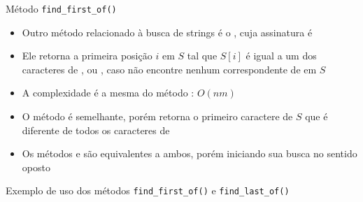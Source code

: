 \begin{frame}[fragile]{Método {\tt find\_first\_of()}}

    \begin{itemize}
        \item Outro método relacionado à busca de strings é o , cuja
            assinatura é

        \vspace{.1in}
        \vspace{.1in}
        \pause
        
        \item Ele retorna a primeira posição $i$ em $S$ tal que $S[i]$ é igual a um dos 
            caracteres de , ou , caso não encontre
            nenhum correspondente de  em $S$
        \pause

        \item A complexidade é a mesma do método : $O(nm)$ 
        \pause

        \item O método  é semelhante, porém retorna o primeiro
            caractere de $S$ que é diferente de todos os caracteres de 
        \pause

        \item Os métodos  e  são
            equivalentes a ambos, porém iniciando sua busca no sentido oposto
    \end{itemize}

\end{frame}

\begin{frame}[fragile]{Exemplo de uso dos métodos {\tt find\_first\_of()} e {\tt find\_last\_of()}}
\end{frame}


